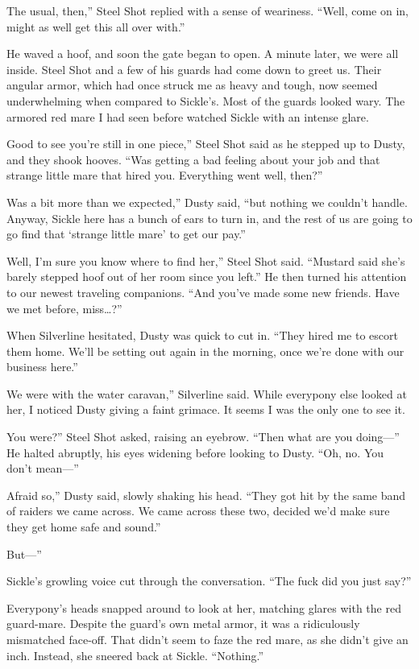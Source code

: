 \leavevmode{}The usual, then,” Steel Shot replied with a sense of weariness. “Well, come on in, might as well get this all over with.”

He waved a hoof, and soon the gate began to open. A minute later, we were all inside. Steel Shot and a few of his guards had come down to greet us. Their angular armor, which had once struck me as heavy and tough, now seemed underwhelming when compared to Sickle’s. Most of the guards looked wary. The armored red mare I had seen before watched Sickle with an intense glare.

\leavevmode{}Good to see you’re still in one piece,” Steel Shot said as he stepped up to Dusty, and they shook hooves. “Was getting a bad feeling about your job and that strange little mare that hired you. Everything went well, then?”

\leavevmode{}Was a bit more than we expected,” Dusty said, “but nothing we couldn’t handle. Anyway, Sickle here has a bunch of ears to turn in, and the rest of us are going to go find that ‘strange little mare’ to get our pay.”

\leavevmode{}Well, I’m sure you know where to find her,” Steel Shot said. “Mustard said she’s barely stepped hoof out of her room since you left.” He then turned his attention to our newest traveling companions. “And you’ve made some new friends. Have we met before, miss…?”

When Silverline hesitated, Dusty was quick to cut in. “They hired me to escort them home. We’ll be setting out again in the morning, once we’re done with our business here.”

\leavevmode{}We were with the water caravan,” Silverline said. While everypony else looked at her, I noticed Dusty giving a faint grimace. It seems I was the only one to see it.

\leavevmode{}You were?” Steel Shot asked, raising an eyebrow. “Then what are you doing—” He halted abruptly, his eyes widening before looking to Dusty. “Oh, no. You don’t mean—”

\leavevmode{}Afraid so,” Dusty said, slowly shaking his head. “They got hit by the same band of raiders we came across. We came across these two, decided we’d make sure they get home safe and sound.”

\leavevmode{}But—”

Sickle’s growling voice cut through the conversation. “The fuck did you just say?”

Everypony’s heads snapped around to look at her, matching glares with the red guard-mare. Despite the guard’s own metal armor, it was a ridiculously mismatched face-off. That didn’t seem to faze the red mare, as she didn’t give an inch. Instead, she sneered back at Sickle. “Nothing.”


